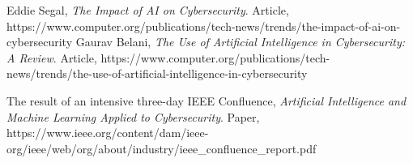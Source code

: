 \documentclass{article}
\begin{document}
\begin{thebibliography}{3} 
   Eddie Segal, \emph{The Impact of AI on Cybersecurity}. Article, https://www.computer.org/publications/tech-news/trends/the-impact-of-ai-on-cybersecurity
 Gaurav Belani, \emph{The Use of Artificial Intelligence in Cybersecurity: A Review}. Article, https://www.computer.org/publications/tech-news/trends/the-use-of-artificial-intelligence-in-cybersecurity

 The	result	of	an intensive	three-day IEEE	Confluence, \emph{Artificial Intelligence and Machine	Learning Applied to Cybersecurity}. Paper, https://www.ieee.org/content/dam/ieee-org/ieee/web/org/about/industry/ieee\_confluence\_report.pdf
 \end{thebibliography}
\end{document}
